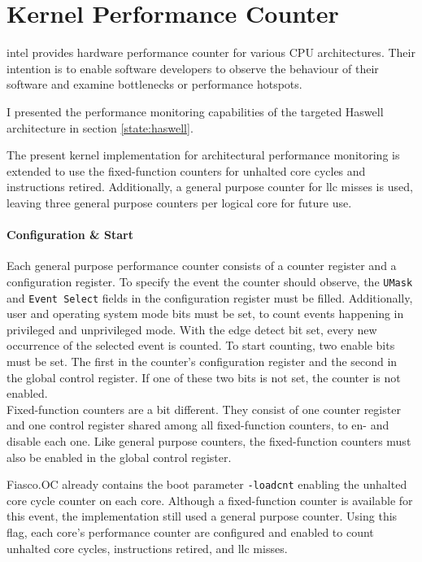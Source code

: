 \section{Kernel Performance Counter}
\label{impl:perfcounter}

\gls{intel} provides hardware performance counter for various CPU
architectures.
Their intention is to enable software developers to observe the behaviour of
their software and examine bottlenecks or performance hotspots.

I presented the performance monitoring capabilities of the targeted Haswell
architecture in section \ref{state:haswell}.

The present kernel implementation for architectural performance monitoring is
extended to use the fixed-function counters for unhalted core cycles and
instructions retired.
Additionally, a general purpose counter for \gls{llc} misses is used,
leaving three general purpose counters per logical core for future use.

\paragraph{Configuration \& Start}
Each general purpose performance counter consists of a counter register and a
configuration register.
To specify the event the counter should observe, the \texttt{UMask} and
\texttt{Event Select} fields in the configuration register must be filled.
Additionally, user and operating system mode bits must be set, to count events
happening in privileged and unprivileged mode.
With the edge detect bit set, every new occurrence of the selected event is
counted.
To start counting, two enable bits must be set.
The first in the counter's configuration register and the second in the global
control register.
If one of these two bits is not set, the counter is not enabled.
\\

Fixed-function counters are a bit different.
They consist of one counter register and one control register shared among all
fixed-function counters, to en- and disable each one.
Like general purpose counters, the fixed-function counters must also be enabled
in the global control register.

Fiasco.OC already contains the boot parameter \texttt{-loadcnt} enabling the
unhalted core cycle counter on each core.
Although a fixed-function counter is available for this event, the
implementation still used a general purpose counter.
Using this flag, each core's performance counter are configured and enabled to
count unhalted core cycles, instructions retired, and \gls{llc} misses.

